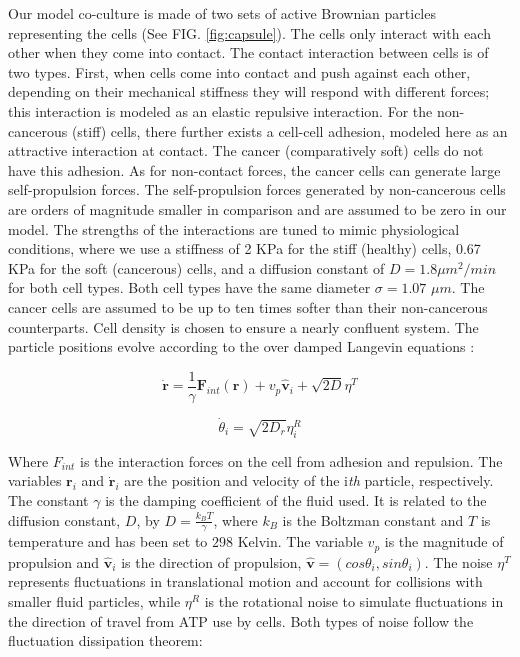 \documentclass[aps,prb,twocolumn,groupedaddress,nofootinbib,floatfix]{revtex4}
\begin{document}
Our model co-culture is made of two sets of active Brownian particles representing the cells (See FIG. \ref{fig:capsule}). The cells only interact with each other when 
they come into contact. The contact interaction between cells is of two types. First, when cells come into
contact and push against each other, depending on their mechanical stiffness they will respond with different forces; this interaction is modeled as an 
elastic repulsive interaction. For the non-cancerous (stiff) cells, there further exists a cell-cell adhesion,
modeled here as an attractive interaction at contact. The cancer (comparatively soft) cells do not have this adhesion. As for non-contact forces, 
the cancer cells can generate large self-propulsion forces. The self-propulsion forces generated by non-cancerous cells are orders of magnitude smaller in comparison 
and are assumed to be zero in our model. The strengths of the interactions are tuned to mimic physiological
conditions, where we use a stiffness of 2 KPa for the stiff (healthy) cells, 0.67 KPa for the soft (cancerous) cells, and a diffusion constant of $D=1.8 \mu m^2/min$ for both cell types. 
Both cell types have the same diameter  $\sigma = 1.07$ $\mu m$.
The cancer cells are assumed to be up to ten times softer than their non-cancerous counterparts. 
Cell density is chosen to ensure a nearly confluent system. The particle positions evolve according to the over damped 
Langevin equations \cite{Lemons,RednerBaskaran,FilyMarchetti,Butcher}: 

\begin{equation}
  \bm{\dot{r}} = \frac{1}{\gamma}\bm{F}_{int}(\bm{r}) + v_p\hat{\bm{v}}_i+\sqrt{2D}\eta^T
\end{equation}

\begin{equation}
  \dot{\theta}_i=\sqrt{2D_r}\eta^R_i
\end{equation}

Where $F_{int}$ is the interaction forces on the cell from adhesion and repulsion.
The variables $\bm{r}_i$ and $\dot{\bm{r}}_i$ are the position and velocity of the i\textit{th} particle, respectively.
The constant $\gamma$ is the damping coefficient of the fluid used. It is related to the
diffusion constant, $D$, by $D=\frac{k_BT}{\gamma}$, where $k_B$ is the Boltzman constant and $T$ is temperature and has been set to $298$ Kelvin. 
The variable $v_p$ is the magnitude of propulsion and $\bm{\hat{v}}_i$ is the direction of propulsion, $\bm{\hat{v}}=(cos\theta_i, sin\theta_i)$.
The noise $\eta^T$ represents fluctuations in translational motion and account for collisions with smaller fluid particles, while
$\eta^R$ is the rotational noise to simulate fluctuations in the direction of travel from ATP use by cells. 
Both types of noise follow the fluctuation dissipation theorem:
\end{document}
